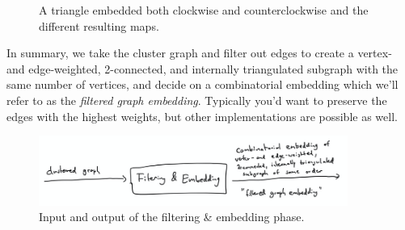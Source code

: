 \begin{figure}[H]
	\centering
	\caption{A triangle embedded both clockwise and counterclockwise and the different resulting maps.}
	\label{fig:filtering-embedding}
\end{figure}

In summary, we take the cluster graph and filter out edges to create a vertex- and edge-weighted, 2-connected, and internally triangulated subgraph with the same number of vertices, and decide on a combinatorial embedding which we'll refer to as the \emph{filtered graph embedding}. Typically you'd want to preserve the edges with the highest weights, but other implementations are possible as well.

\begin{figure}[H]
	\centering\includegraphics[width=0.9\textwidth]{Resources/Pipeline-Filtering-and-Embedding.png}
	\caption{Input and output of the filtering \& embedding phase.}
	\label{fig:pipeline-filtering-and-embedding}
\end{figure}
